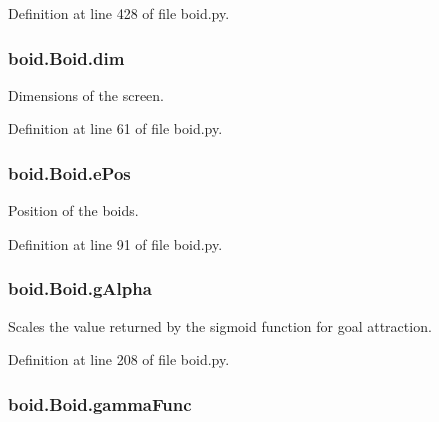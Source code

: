 Definition at line 428 of file boid.\-py.

\hypertarget{classboid_1_1Boid_a88a68e23e37b82bfe9862d7cd79542ad}{
\subsubsection[{dim}]{\setlength{\rightskip}{0pt plus 5cm}boid.\-Boid.\-dim}}\label{classboid_1_1Boid_a88a68e23e37b82bfe9862d7cd79542ad}


Dimensions of the screen. 



Definition at line 61 of file boid.\-py.

\hypertarget{classboid_1_1Boid_a15b3d73058c73aed19d2e9fb0266805d}{
\subsubsection[{e\-Pos}]{\setlength{\rightskip}{0pt plus 5cm}boid.\-Boid.\-e\-Pos}}\label{classboid_1_1Boid_a15b3d73058c73aed19d2e9fb0266805d}


Position of the boids. 



Definition at line 91 of file boid.\-py.

\hypertarget{classboid_1_1Boid_a5090639a7e3a489c8dc83bd12b6d1653}{
\subsubsection[{g\-Alpha}]{\setlength{\rightskip}{0pt plus 5cm}boid.\-Boid.\-g\-Alpha}}\label{classboid_1_1Boid_a5090639a7e3a489c8dc83bd12b6d1653}


Scales the value returned by the sigmoid function for goal attraction. 



Definition at line 208 of file boid.\-py.

\hypertarget{classboid_1_1Boid_abce5218cbba7b3d9f12dc78bbb9dab5e}{
\subsubsection[{gamma\-Func}]{\setlength{\rightskip}{0pt plus 5cm}boid.\-Boid.\-gamma\-Func}}\label{classboid_1_1Boid_abce5218cbba7b3d9f12dc78bbb9dab5e}


